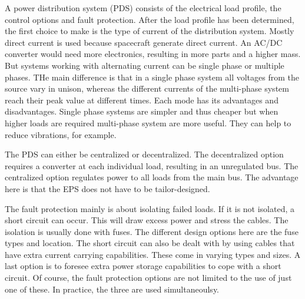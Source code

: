 A power distribution system (PDS) consists of the electrical load profile, the control options and fault protection.
After the load profile has been determined, the first choice to make is the type of current of the distribution system. Mostly direct current is used because spacecraft generate direct current. An AC/DC converter would need more electronics, resulting in more parts and a higher mass. 
But systems working with alternating current can be single phase or multiple phases\cite{kuphaldt}. THe main difference is that in a single phase system all voltages from the source vary in unison, whereas the different currents of the multi-phase system reach their peak value at different times. Each mode has its advantages and disadvantages. Single phase systems are simpler and thus cheaper but when higher loads are required multi-phase system are more useful. They can help to reduce vibrations, for example.

The PDS can either be centralized or decentralized. The decentralized option requires a converter at each individual load, resulting in an unregulated bus. The centralized option regulates power to all loads from the main bus. The advantage here is that the EPS does not have to be tailor-designed. 

The fault protection mainly is about isolating failed loads. If it is not isolated, a short circuit can occur. This will draw excess power and stress the cables. The isolation is usually done with fuses. The different design options here are the fuse types and location.
The short circuit can also be dealt with by using cables that have extra current carrying capabilities. These come in varying types and sizes.
A last option is to foresee extra power storage capabilities to cope with a short circuit.
Of course, the fault protection options are not limited to the use of just one of these. In practice, the three are used simultaneoulsy.